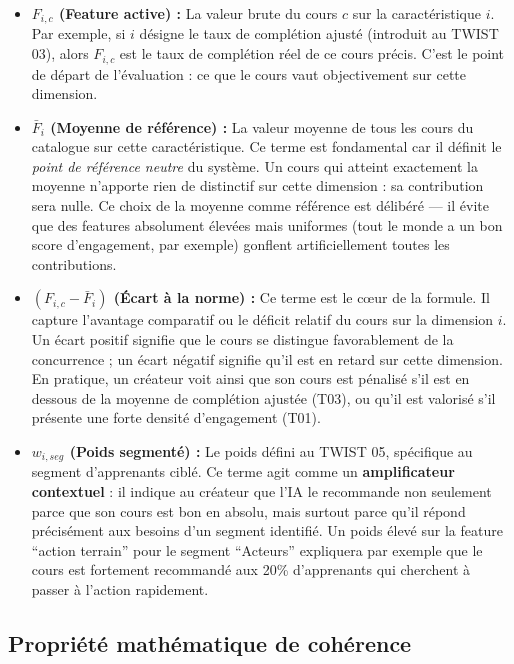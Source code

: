 \documentclass[11pt,a4paper]{article}
\begin{document}
\begin{itemize}
    \item \textbf{$F_{i,c}$ (Feature active) :} La valeur brute du cours $c$ sur la caractéristique $i$. Par exemple, si $i$ désigne le taux de complétion ajusté (introduit au TWIST 03), alors $F_{i,c}$ est le taux de complétion réel de ce cours précis. C'est le point de départ de l'évaluation : ce que le cours vaut objectivement sur cette dimension.

    \item \textbf{$\bar{F}_i$ (Moyenne de référence) :} La valeur moyenne de tous les cours du catalogue sur cette caractéristique. Ce terme est fondamental car il définit le \textit{point de référence neutre} du système. Un cours qui atteint exactement la moyenne n'apporte rien de distinctif sur cette dimension : sa contribution sera nulle. Ce choix de la moyenne comme référence est délibéré — il évite que des features absolument élevées mais uniformes (tout le monde a un bon score d'engagement, par exemple) gonflent artificiellement toutes les contributions.

    \item \textbf{$(F_{i,c} - \bar{F}_i)$ (Écart à la norme) :} Ce terme est le cœur de la formule. Il capture l'avantage comparatif ou le déficit relatif du cours sur la dimension $i$. Un écart positif signifie que le cours se distingue favorablement de la concurrence ; un écart négatif signifie qu'il est en retard sur cette dimension. En pratique, un créateur voit ainsi que son cours est pénalisé s'il est en dessous de la moyenne de complétion ajustée (T03), ou qu'il est valorisé s'il présente une forte densité d'engagement (T01).

    \item \textbf{$w_{i, seg}$ (Poids segmenté) :} Le poids défini au TWIST 05, spécifique au segment d'apprenants ciblé. Ce terme agit comme un \textbf{amplificateur contextuel} : il indique au créateur que l'IA le recommande non seulement parce que son cours est bon en absolu, mais surtout parce qu'il répond précisément aux besoins d'un segment identifié. Un poids élevé sur la feature ``action terrain'' pour le segment ``Acteurs'' expliquera par exemple que le cours est fortement recommandé aux 20\% d'apprenants qui cherchent à passer à l'action rapidement.
\end{itemize}

\subsection{Propriété mathématique de cohérence}
\end{document}

